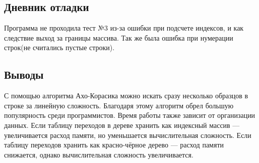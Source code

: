 \documentclass[12pt]{article}
\begin{document}
\subsection*{Дневник отладки}

Программа не проходила тест №3 из-за ошибки при подсчете индексов, и как следствие выход за границы массива. Так же была ошибка при нумерации строк(не считались пустые строки).

\subsection*{Выводы}
С помощью алгоритма Ахо-Корасика можно искать сразу несколько образцов в строке за линейную сложность. Благодаря этому алгоритм обрел большую популярность среди программистов.
Время работы также зависит от организации данных. Если таблицу переходов в дереве хранить как индексный массив — увеличивается расход памяти, но уменьшается вычислительная сложность. Если таблицу переходов хранить как красно-чёрное дерево — расход памяти снижается, однако вычислительная сложность увеличивается.
\end{document}
